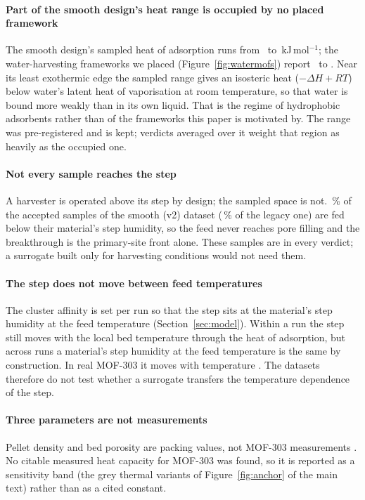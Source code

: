 \paragraph{Part of the smooth design's heat range is occupied by no placed framework} The
smooth design's sampled heat of adsorption runs from \nDcDHLo\ to \nDcDHHi\,kJ\,mol\(^{-1}\); the
water-harvesting frameworks we placed (Figure~\ref{fig:watermofs}) report \nWmofHeatMost\ to
\nWmofHeatLeast. Near its least exothermic edge the sampled range gives an isosteric
heat (\(-\Delta H + RT\)) below water's latent heat of vaporisation at room
temperature, so that water is bound more weakly than in its own liquid. That is the
regime of hydrophobic adsorbents rather than of the frameworks this paper is
motivated by. The range was pre-registered and is kept; verdicts averaged over it
weight that region as heavily as the occupied one.

\paragraph{Not every sample reaches the step} A harvester is operated above its
step by design; the sampled space is not. \nChemBelowStepPct\,\% of the accepted
samples of the smooth (v2) dataset (\nChemBelowStepLegPct\,\% of the legacy one) are fed
below their material's step humidity, so the feed never reaches pore filling and the
breakthrough is the primary-site front alone. These samples are in every verdict; a
surrogate built only for harvesting conditions would not need them.

\paragraph{The step does not move between feed temperatures} The cluster affinity is
set per run so that the step sits at the material's step humidity at the feed
temperature (Section~\ref{sec:model}). Within a run the step still moves with the
local bed temperature through the heat of adsorption, but across runs a material's
step humidity at the feed temperature is the same by construction. In real MOF-303
it moves with temperature \cite{hastings2024high}. The
datasets therefore do not test whether a surrogate transfers
the temperature dependence of the step.

\paragraph{Three parameters are not measurements} Pellet density and bed porosity
are packing values, not MOF-303 measurements \cite{hanikel2021evolution}. No citable measured heat capacity for
MOF-303 was found, so it is reported as a sensitivity band (the grey thermal variants of
Figure~\ref{fig:anchor} of the main text) rather than as a cited constant.

